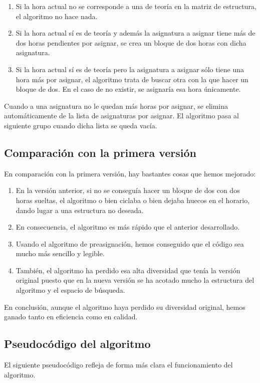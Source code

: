 \begin{enumerate}[---]
  \item Si la hora actual no se corresponde a una de teoría en la matriz de estructura, el algoritmo no hace nada.
  \item Si la hora actual sí es de teoría y además la asignatura a asignar tiene más de dos horas pendientes por asignar, se crea un bloque de dos horas con dicha asignatura.
  \item Si la hora actual sí es de teoría pero la asignatura a asignar sólo tiene una hora más por asignar, el algoritmo trata de buscar otra con la que hacer un bloque de dos. En el caso de no existir, se asignaría esa hora únicamente.
\end{enumerate}

Cuando a una asignatura no le quedan más horas por asignar, se elimina automáticamente de la lista de asignaturas por asignar. El algoritmo pasa al siguiente grupo cuando dicha lista se queda vacía.

\subsection{Comparación con la primera versión}
En comparación con la primera versión, hay bastantes cosas que hemos mejorado:

\begin{enumerate}[$\bullet$]
  \item En la versión anterior, si no se conseguía hacer un bloque de dos con dos horas sueltas, el algoritmo o bien ciclaba o bien dejaba huecos en el horario, dando lugar a una estructura no deseada.
  \item En consecuencia, el algoritmo es más rápido que el anterior desarrollado.
  \item Usando el algoritmo de preasignación, hemos conseguido que el código sea mucho más sencillo y legible.
  \item También, el algoritmo ha perdido esa alta diversidad que tenía la versión original puesto que en la nueva versión se ha acotado mucho la estructura del algoritmo y el espacio de búsqueda.
\end{enumerate}

En conclusión, aunque el algoritmo haya perdido su diversidad original, hemos ganado tanto en eficiencia como en calidad.

\subsection{Pseudocódigo del algoritmo}
El siguiente pseudocódigo refleja de forma más clara el funcionamiento del algoritmo.

